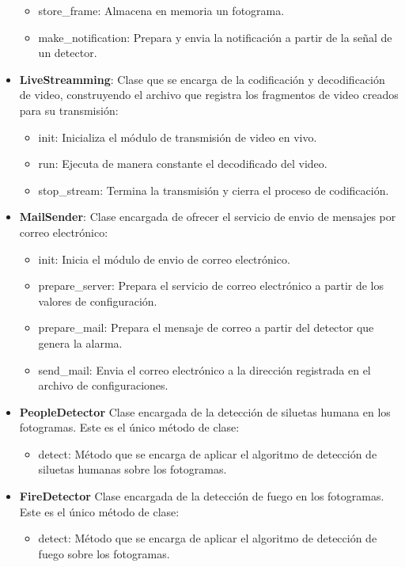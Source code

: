 \begin{itemize}
\begin{itemize}
            \item store\_frame: Almacena en memoria un fotograma.
            \item make\_notification: Prepara y envia la notificación a partir de la señal de un detector.
        \end{itemize}
    \item \textbf{LiveStreamming}: Clase que se encarga de la codificación y decodificación de video, construyendo el archivo que registra los fragmentos de video creados para su transmisión:
        \begin{itemize}
            \item init: Inicializa el módulo de transmisión de video en vivo.
            \item run: Ejecuta de manera constante el decodificado del video.
            \item stop\_stream: Termina la transmisión y cierra el proceso de codificación.
        \end{itemize}
    \item \textbf{MailSender}: Clase encargada de ofrecer el servicio de envio de mensajes por correo electrónico:
        \begin{itemize}
            \item init: Inicia el módulo de envio de correo electrónico.
            \item prepare\_server: Prepara el servicio de correo electrónico a partir de los valores de configuración.
            \item prepare\_mail: Prepara el mensaje de correo a partir del detector que genera la alarma.
            \item send\_mail: Envia el correo electrónico a la dirección registrada en el archivo de configuraciones.
        \end{itemize}
    \item \textbf{PeopleDetector} Clase encargada de la detección de siluetas humana en los fotogramas. Este es el único método de clase:
        \begin{itemize}
            \item detect: Método que se encarga de aplicar el algoritmo de detección de siluetas humanas sobre los fotogramas.
        \end{itemize}
    \item \textbf{FireDetector} Clase encargada de la detección de fuego en los fotogramas. Este es el único método de clase:
        \begin{itemize}
            \item detect: Método que se encarga de aplicar el algoritmo de detección de fuego sobre los fotogramas.

\end{itemize}
\end{itemize}
